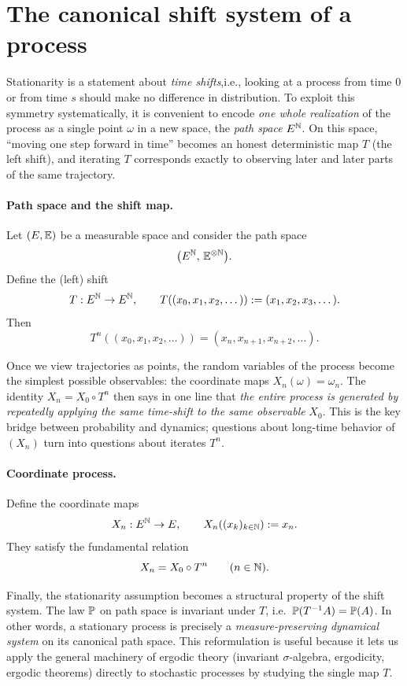 \section{The canonical shift system of a process}

Stationarity is a statement about \emph{time shifts},i.e., looking at a process from time $0$ or from time $s$ should make no
difference in distribution. To exploit this symmetry systematically, it is convenient to encode \emph{one whole
realization} of the process as a single point $\omega$ in a new space, the \emph{path space} $E^{\mathbb{N}}$. On this space,
``moving one step forward in time'' becomes an honest deterministic map $T$ (the left shift), and iterating $T$
corresponds exactly to observing later and later parts of the same trajectory.

\paragraph{Path space and the shift map.}
Let \((E,\mathbb{E})\) be a measurable space and consider the path space
\[
\bigl(E^{\mathbb{N}},\,\mathbb{E}^{\otimes \mathbb{N}}\bigr).
\]
Define the (left) shift
\[
T:E^{\mathbb{N}} \to E^{\mathbb{N}},
\qquad
T((x_0,x_1,x_2,\dots)) := (x_1,x_2,x_3,\dots).
\]
Then
\[
T^n((x_0,x_1,x_2,\dots)) = (x_n,x_{n+1},x_{n+2},\dots).
\]

\medskip
Once we view trajectories as points, the random variables of the process become the simplest possible observables:
the coordinate maps $X_n(\omega)=\omega_n$. The identity $X_n=X_0\circ T^n$ then says in one line that \emph{the entire
process is generated by repeatedly applying the same time-shift to the same observable} $X_0$.
This is the key bridge between probability and dynamics; questions about long-time behavior of $(X_n)$ turn into
questions about iterates $T^n$.

\paragraph{Coordinate process.}
Define the coordinate maps
\[
X_n:E^{\mathbb{N}} \to E,
\qquad
X_n((x_k)_{k\in\mathbb{N}}) := x_n.
\]
They satisfy the fundamental relation
\[
X_n = X_0\circ T^n
\qquad (n\in\mathbb{N}).
\]

\medskip

Finally, the stationarity assumption becomes a structural property of the shift system. The law $\mathbb{P}$ on path space is invariant under $T$, i.e.\ $\mathbb{P}(T^{-1}A)=\mathbb{P}(A)$. In other words, a stationary process
is precisely a \emph{measure-preserving dynamical system} on its canonical path space.
This reformulation is useful because it lets us apply the general machinery of ergodic theory (invariant
$\sigma$-algebra, ergodicity, ergodic theorems) directly to stochastic processes by studying the single map $T$.

